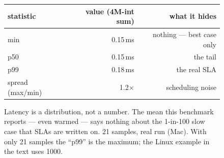 \begin{figure}[htbp]
\centering
\begin{tabular}{lrr}
\toprule
statistic & value (4M-int sum) & what it hides \\
\midrule
min & 0.15\,ms & nothing --- best case only \\
p50 & 0.15\,ms & the tail \\
p99 & 0.18\,ms & the real SLA \\
spread (max/min) & 1.2$\times$ & scheduling noise \\
\bottomrule
\end{tabular}
\caption{Latency is a distribution, not a number. The mean this
benchmark reports --- even warmed --- says nothing about the 1-in-100
slow case that SLAs are written on. 21 samples, real run (Mac). With only 21 samples the ``p99'' is the maximum; the Linux example in the text uses 1000.}
\label{fig:tail15}
\end{figure}
